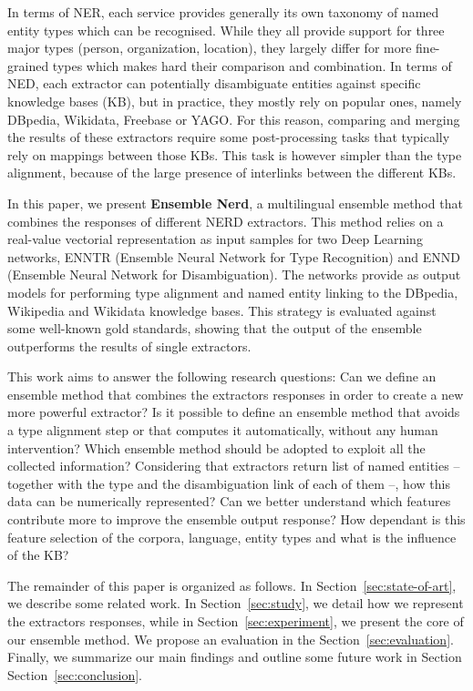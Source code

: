 \documentclass{llncs}
\newcommand{\secref}[1]{\mbox{Section~\ref{#1}}}
\begin{document}
In terms of NER, each service provides generally its own taxonomy of named entity types which can be recognised. While they all provide support for three major types (person, organization, location), they largely differ for more fine-grained types which makes hard their comparison and combination. In terms of NED, each extractor can potentially disambiguate entities against specific knowledge bases (KB), but in practice, they mostly rely on popular ones, namely DBpedia, Wikidata, Freebase or YAGO. For this reason, comparing and merging the results of these extractors require some post-processing tasks that typically rely on mappings between those KBs. This task is however simpler than the type alignment, because of the large presence of interlinks between the different KBs.

In this paper, we present \textbf{Ensemble Nerd}, a multilingual ensemble method that combines the responses of different NERD extractors. This method relies on a real-value vectorial representation as input samples for two Deep Learning networks, ENNTR (Ensemble Neural Network for Type Recognition) and ENND (Ensemble Neural Network for Disambiguation). The networks provide as output models for performing type alignment and named entity linking to the DBpedia, Wikipedia and Wikidata knowledge bases. This strategy is evaluated against some well-known gold standards, showing that the output of the ensemble outperforms the results of single extractors. 

This work aims to answer the following research questions: Can we define an ensemble method that combines the extractors responses in order to create a new more powerful extractor? Is it possible to define an ensemble method that avoids a type alignment step or that computes it automatically, without any human intervention? Which ensemble method should be adopted to exploit all the collected information? Considering that extractors return list of named entities -- together with the type and the disambiguation link of each of them --, how this data can be numerically represented? Can we better understand which features contribute more to improve the ensemble output response? How dependant is this feature selection of the corpora, language, entity types and what is the influence of the KB?

The remainder of this paper is organized as follows. In \secref{sec:state-of-art}, we describe some related work. In \secref{sec:study}, we detail how we represent the extractors responses, while in \secref{sec:experiment}, we present the core of our ensemble method. We propose an evaluation in the \secref{sec:evaluation}. Finally, we summarize our main findings and outline some future work in Section \secref{sec:conclusion}.
\end{document}
